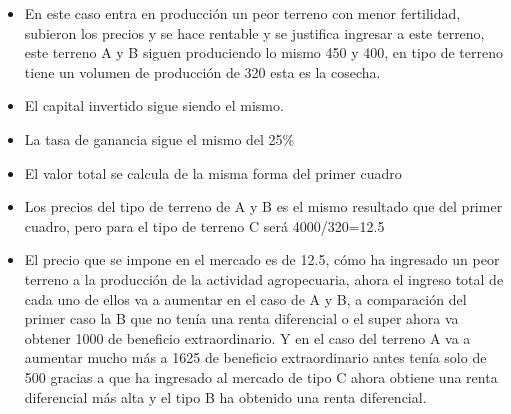 \documentclass[
  letterpaper,
  DIV=11,
  numbers=noendperiod]{scrartcl}
\begin{document}
\begin{itemize}
\item
  En este caso entra en producción un peor terreno con menor fertilidad,
  subieron los precios y se hace rentable y se justifica ingresar a este
  terreno, este terreno A y B siguen produciendo lo mismo 450 y 400, en
  tipo de terreno tiene un volumen de producción de 320 esta es la
  cosecha.
\item
  El capital invertido sigue siendo el mismo.
\item
  La tasa de ganancia sigue el mismo del 25\%
\item
  El valor total se calcula de la misma forma del primer cuadro
\item
  Los precios del tipo de terreno de A y B es el mismo resultado que del
  primer cuadro, pero para el tipo de terreno C será 4000/320=12.5
\item
  El precio que se impone en el mercado es de 12.5, cómo ha ingresado un
  peor terreno a la producción de la actividad agropecuaria, ahora el
  ingreso total de cada uno de ellos va a aumentar en el caso de A y B,
  a comparación del primer caso la B que no tenía una renta diferencial
  o el super ahora va obtener 1000 de beneficio extraordinario. Y en el
  caso del terreno A va a aumentar mucho más a 1625 de beneficio
  extraordinario antes tenía solo de 500 gracias a que ha ingresado al
  mercado de tipo C ahora obtiene una renta diferencial más alta y el
  tipo B ha obtenido una renta diferencial.
\end{itemize}
\end{document}
